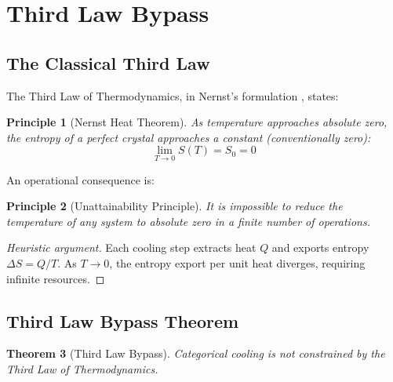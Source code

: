 \documentclass[twocolumn,10pt,twoside]{article}
\newtheorem{theorem}{Theorem}[section]
\newtheorem{principle}[theorem]{Principle}
\begin{document}
\section{Third Law Bypass}

\subsection{The Classical Third Law}

The Third Law of Thermodynamics, in Nernst's formulation \cite{nernst1906}, states:

\begin{principle}[Nernst Heat Theorem]
\label{principle:nernst}
As temperature approaches absolute zero, the entropy of a perfect crystal approaches a constant (conventionally zero):
\begin{equation}
\lim_{T \to 0} S(T) = S_0 = 0
\end{equation}
\end{principle}

An operational consequence is:

\begin{principle}[Unattainability Principle]
\label{principle:unattainability}
It is impossible to reduce the temperature of any system to absolute zero in a finite number of operations.
\end{principle}

\begin{proof}[Heuristic argument]
Each cooling step extracts heat $Q$ and exports entropy $\Delta S = Q/T$. As $T \to 0$, the entropy export per unit heat diverges, requiring infinite resources.
\end{proof}

\subsection{Third Law Bypass Theorem}

\begin{theorem}[Third Law Bypass]
\label{thm:third_law_bypass}
Categorical cooling is not constrained by the Third Law of Thermodynamics.
\end{theorem}
\end{document}
